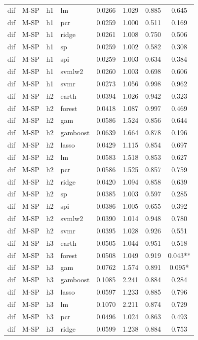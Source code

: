 \begin{ThreePartTable}
\begin{longtable}[t]{llclcccc}
dif & M-SP & h1 & lm & 0.0266 & 1.029 & 0.885 & 0.645\\
dif & M-SP & h1 & pcr & 0.0259 & 1.000 & 0.511 & 0.169\\
dif & M-SP & h1 & ridge & 0.0261 & 1.008 & 0.750 & 0.506\\
dif & M-SP & h1 & sp & 0.0259 & 1.002 & 0.582 & 0.308\\
dif & M-SP & h1 & spi & 0.0259 & 1.003 & 0.634 & 0.384\\
dif & M-SP & h1 & svmlw2 & 0.0260 & 1.003 & 0.698 & 0.606\\
dif & M-SP & h1 & svmr & 0.0273 & 1.056 & 0.998 & 0.962\\
\addlinespace
dif & M-SP & h2 & earth & 0.0394 & 1.026 & 0.942 & 0.323\\
dif & M-SP & h2 & forest & 0.0418 & 1.087 & 0.997 & 0.469\\
dif & M-SP & h2 & gam & 0.0586 & 1.524 & 0.856 & 0.644\\
dif & M-SP & h2 & gamboost & 0.0639 & 1.664 & 0.878 & 0.196\\
dif & M-SP & h2 & lasso & 0.0429 & 1.115 & 0.854 & 0.697\\
dif & M-SP & h2 & lm & 0.0583 & 1.518 & 0.853 & 0.627\\
dif & M-SP & h2 & pcr & 0.0586 & 1.525 & 0.857 & 0.759\\
dif & M-SP & h2 & ridge & 0.0420 & 1.094 & 0.858 & 0.639\\
dif & M-SP & h2 & sp & 0.0385 & 1.003 & 0.597 & 0.285\\
dif & M-SP & h2 & spi & 0.0386 & 1.005 & 0.655 & 0.392\\
dif & M-SP & h2 & svmlw2 & 0.0390 & 1.014 & 0.948 & 0.780\\
dif & M-SP & h2 & svmr & 0.0395 & 1.028 & 0.926 & 0.551\\
\addlinespace
dif & M-SP & h3 & earth & 0.0505 & 1.044 & 0.951 & 0.518\\
dif & M-SP & h3 & forest & 0.0508 & 1.049 & 0.919 & 0.043**\\
dif & M-SP & h3 & gam & 0.0762 & 1.574 & 0.891 & 0.095*\\
dif & M-SP & h3 & gamboost & 0.1085 & 2.241 & 0.884 & 0.284\\
dif & M-SP & h3 & lasso & 0.0597 & 1.233 & 0.885 & 0.796\\
dif & M-SP & h3 & lm & 0.1070 & 2.211 & 0.874 & 0.729\\
dif & M-SP & h3 & pcr & 0.0496 & 1.024 & 0.863 & 0.493\\
dif & M-SP & h3 & ridge & 0.0599 & 1.238 & 0.884 & 0.753\\

\end{longtable}
\end{ThreePartTable}

